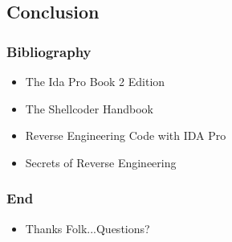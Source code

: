 \documentclass[]{beamer}
\begin{document}
		\subsection{Conclusion}
		\begin{frame}
			\frametitle{Bibliography}
			\begin{itemize}
				\item{The Ida Pro Book 2 Edition }
				\item{The Shellcoder Handbook}
				\item{Reverse Engineering Code with IDA Pro}
				\item{Secrets of Reverse Engineering}
			\end{itemize}
		\end{frame}
		\begin{frame}
			\frametitle{End}
			\begin{itemize}
				\item{Thanks Folk...Questions?}
			\end{itemize}
		\end{frame}




\end{document}
